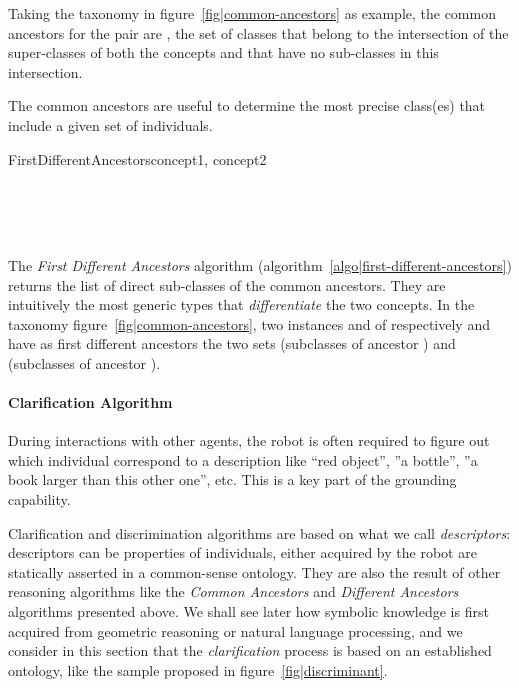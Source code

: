 Taking the taxonomy in figure~\ref{fig|common-ancestors} as example, the common
ancestors for the pair  are
, \ie the set of classes that belong to
the intersection of the super-classes of both the concepts and that have no
sub-classes in this intersection.

The common ancestors are useful  to determine the most precise class(es) that
include a given set of individuals.

\small
\begin{pseudocode}[ruled]{FirstDifferentAncestors}{concept1, concept2}
\label{algo|first-different-ancestors}

\BEGIN
{} \GETS {} \\
 \GETS {} \cup {} \\

 \\
\END

\end{pseudocode}
\normalsize

The \emph{First Different Ancestors} algorithm
(algorithm~\ref{algo|first-different-ancestors}) returns the list of direct
sub-classes of the common ancestors. They are intuitively the most generic
types that \emph{differentiate} the two concepts. In the taxonomy
figure~\ref{fig|common-ancestors}, two instances  and  of
respectively  and  have as first different
ancestors the two sets  (subclasses of ancestor
) and  (subclasses of
ancestor ).

\paragraph{Clarification Algorithm}
\label{sect|clarify}

During interactions with other agents, the robot is often required to figure
out which individual correspond to a description like ``red object'', ''a
bottle'', ''a book larger than this other one'', etc. This is a key part of the
grounding capability.

Clarification and discrimination algorithms are based on what we call
\emph{descriptors}: descriptors can be properties of individuals, either
acquired by the robot are statically asserted in a common-sense ontology. They
are also the result of other reasoning algorithms like the \emph{Common
Ancestors} and \emph{Different Ancestors} algorithms presented above.
We shall see later how symbolic knowledge is first acquired from geometric
reasoning or natural language processing, and we consider in this section that
the \emph{clarification} process is based on an established ontology, like the
sample proposed in figure~\ref{fig|discriminant}.

